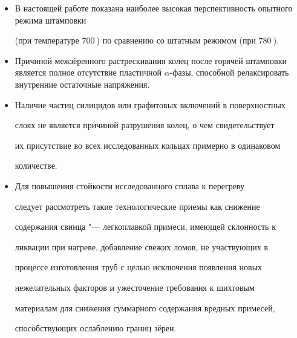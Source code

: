 \begin{itemize}



\item[1.] В настоящей работе показана наиболее высокая перспективность опытного режима штамповки

(при температуре $700~$\textcelsius) по сравнению со штатным режимом (при $780~$\textcelsius).



\item[2.] Причиной межзёренного растрескивания колец после горячей штамповки является полное отсутствие пластичной $\alpha $-фазы, способной релаксировать внутренние остаточные напряжения.



\item[3.] Наличие частиц силицидов или графитовых включений в поверхностных

слоях не является причиной разрушения колец, о чем свидетельствует

их присутствие во всех исследованных кольцах примерно в одинаковом

количестве.



\item[4.] Для повышения стойкости исследованного сплава к перегреву

следует рассмотреть такие технологические приемы как снижение

содержания свинца "--- легкоплавкой примеси, имеющей склонность к

ликвации при нагреве, добавление свежих ломов, не участвующих в

процессе изготовления труб с целью исключения появления новых

нежелательных факторов и ужесточение требования к шихтовым

материалам для снижения суммарного содержания вредных примесей,

способствующих ослаблению границ зёрен.





\end{itemize}



